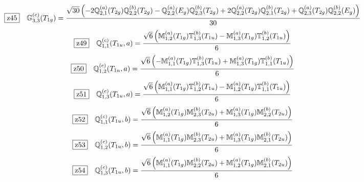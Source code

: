 \documentclass[fleqn,10pt,landscape]{jsarticle}
\begin{document}
\begin{dmath*}
\hspace*{3mm}\fbox{z45}\quad \mathbb{G}_{3,3}^{(c)}(T_{1g})=\frac{\sqrt{30} \left(- 2 \mathbb{Q}_{2,1}^{(a)}(T_{2g}) \mathbb{Q}_{2,2}^{(b)}(T_{2g}) - \mathbb{Q}_{2,2}^{(a)}(E_{g}) \mathbb{Q}_{2,3}^{(b)}(T_{2g}) + 2 \mathbb{Q}_{2,2}^{(a)}(T_{2g}) \mathbb{Q}_{2,1}^{(b)}(T_{2g}) + \mathbb{Q}_{2,3}^{(a)}(T_{2g}) \mathbb{Q}_{2,2}^{(b)}(E_{g})\right)}{30}
\end{dmath*}
\begin{dmath*}
\hspace*{3mm}\fbox{z49}\quad \mathbb{Q}_{1,1}^{(c)}(T_{1u},a)=\frac{\sqrt{6} \left(\mathbb{M}_{1,2}^{(a)}(T_{1g}) \mathbb{T}_{1,3}^{(b)}(T_{1u}) - \mathbb{M}_{1,3}^{(a)}(T_{1g}) \mathbb{T}_{1,2}^{(b)}(T_{1u})\right)}{6}
\end{dmath*}
\begin{dmath*}
\hspace*{3mm}\fbox{z50}\quad \mathbb{Q}_{1,2}^{(c)}(T_{1u},a)=\frac{\sqrt{6} \left(- \mathbb{M}_{1,1}^{(a)}(T_{1g}) \mathbb{T}_{1,3}^{(b)}(T_{1u}) + \mathbb{M}_{1,3}^{(a)}(T_{1g}) \mathbb{T}_{1,1}^{(b)}(T_{1u})\right)}{6}
\end{dmath*}
\begin{dmath*}
\hspace*{3mm}\fbox{z51}\quad \mathbb{Q}_{1,3}^{(c)}(T_{1u},a)=\frac{\sqrt{6} \left(\mathbb{M}_{1,1}^{(a)}(T_{1g}) \mathbb{T}_{1,2}^{(b)}(T_{1u}) - \mathbb{M}_{1,2}^{(a)}(T_{1g}) \mathbb{T}_{1,1}^{(b)}(T_{1u})\right)}{6}
\end{dmath*}
\begin{dmath*}
\hspace*{3mm}\fbox{z52}\quad \mathbb{Q}_{1,1}^{(c)}(T_{1u},b)=\frac{\sqrt{6} \left(\mathbb{M}_{1,2}^{(a)}(T_{1g}) \mathbb{M}_{2,3}^{(b)}(T_{2u}) + \mathbb{M}_{1,3}^{(a)}(T_{1g}) \mathbb{M}_{2,2}^{(b)}(T_{2u})\right)}{6}
\end{dmath*}
\begin{dmath*}
\hspace*{3mm}\fbox{z53}\quad \mathbb{Q}_{1,2}^{(c)}(T_{1u},b)=\frac{\sqrt{6} \left(\mathbb{M}_{1,1}^{(a)}(T_{1g}) \mathbb{M}_{2,3}^{(b)}(T_{2u}) + \mathbb{M}_{1,3}^{(a)}(T_{1g}) \mathbb{M}_{2,1}^{(b)}(T_{2u})\right)}{6}
\end{dmath*}
\begin{dmath*}
\hspace*{3mm}\fbox{z54}\quad \mathbb{Q}_{1,3}^{(c)}(T_{1u},b)=\frac{\sqrt{6} \left(\mathbb{M}_{1,1}^{(a)}(T_{1g}) \mathbb{M}_{2,2}^{(b)}(T_{2u}) + \mathbb{M}_{1,2}^{(a)}(T_{1g}) \mathbb{M}_{2,1}^{(b)}(T_{2u})\right)}{6}
\end{dmath*}
\end{document}
